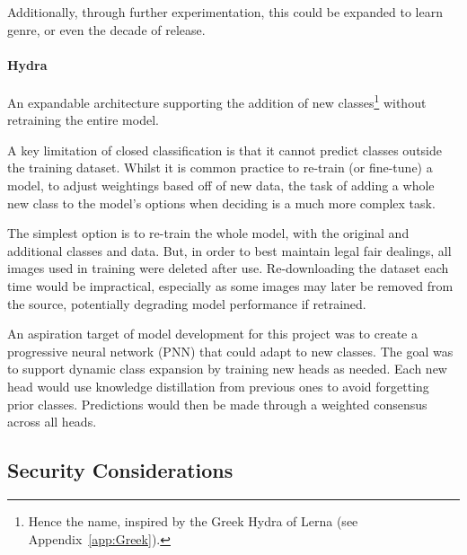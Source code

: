                 Additionally, through further experimentation, this could be expanded to learn genre, or even the decade of release.
    
                \paragraph{Hydra} An expandable architecture supporting the addition of new classes\footnote{Hence the name, inspired by the Greek Hydra of Lerna (see Appendix~\ref{app:Greek}).} without retraining the entire model.
                
    
                A key limitation of closed classification is that it cannot predict classes outside the training dataset. Whilst it is common practice to re-train (or fine-tune) a model, to adjust weightings based off of new data, the task of adding a whole new class to the model's options when deciding is a much more complex task.
    
                The simplest option is to re-train the whole model, with the original and additional classes and data. But, in order to best maintain legal fair dealings, all images used in training were deleted after use. Re-downloading the dataset each time would be impractical, especially as some images may later be removed from the source, potentially degrading model performance if retrained.
    
                An aspiration target of model development for this project was to create a progressive neural network (PNN) that could adapt to new classes. The goal was to support dynamic class expansion by training new heads as needed. Each new head would use knowledge distillation from previous ones to avoid forgetting prior classes. Predictions would then be made through a weighted consensus across all heads.
    
        \subsection{Security Considerations} \label{sec:security}
            
